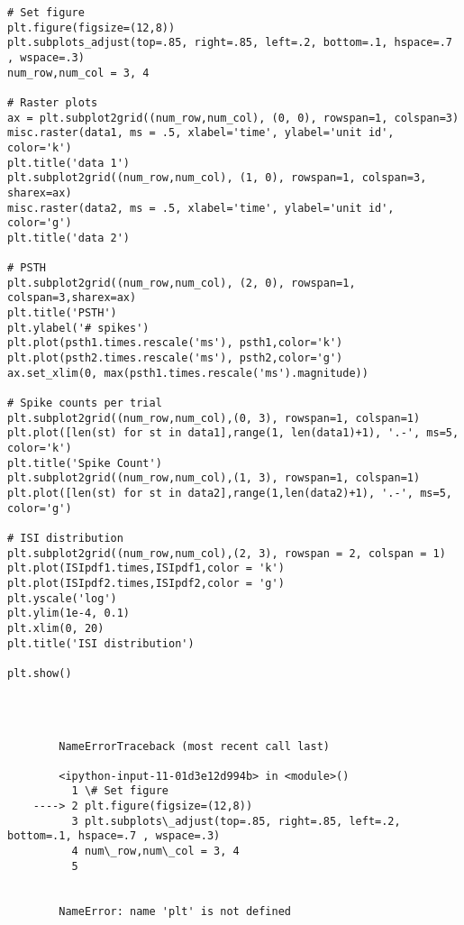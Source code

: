 \begin{lstlisting}
# Set figure
plt.figure(figsize=(12,8))
plt.subplots_adjust(top=.85, right=.85, left=.2, bottom=.1, hspace=.7 , wspace=.3)
num_row,num_col = 3, 4

# Raster plots
ax = plt.subplot2grid((num_row,num_col), (0, 0), rowspan=1, colspan=3)
misc.raster(data1, ms = .5, xlabel='time', ylabel='unit id', color='k')
plt.title('data 1')
plt.subplot2grid((num_row,num_col), (1, 0), rowspan=1, colspan=3, sharex=ax)
misc.raster(data2, ms = .5, xlabel='time', ylabel='unit id', color='g')
plt.title('data 2')

# PSTH
plt.subplot2grid((num_row,num_col), (2, 0), rowspan=1, colspan=3,sharex=ax)
plt.title('PSTH')
plt.ylabel('# spikes')
plt.plot(psth1.times.rescale('ms'), psth1,color='k')
plt.plot(psth2.times.rescale('ms'), psth2,color='g')
ax.set_xlim(0, max(psth1.times.rescale('ms').magnitude))

# Spike counts per trial
plt.subplot2grid((num_row,num_col),(0, 3), rowspan=1, colspan=1)
plt.plot([len(st) for st in data1],range(1, len(data1)+1), '.-', ms=5, color='k')
plt.title('Spike Count')
plt.subplot2grid((num_row,num_col),(1, 3), rowspan=1, colspan=1)
plt.plot([len(st) for st in data2],range(1,len(data2)+1), '.-', ms=5, color='g')

# ISI distribution
plt.subplot2grid((num_row,num_col),(2, 3), rowspan = 2, colspan = 1)
plt.plot(ISIpdf1.times,ISIpdf1,color = 'k')
plt.plot(ISIpdf2.times,ISIpdf2,color = 'g')
plt.yscale('log')
plt.ylim(1e-4, 0.1)
plt.xlim(0, 20)
plt.title('ISI distribution')

plt.show()
\end{lstlisting}%
    \begin{Verbatim}[commandchars=\\\{\}]

        

        NameErrorTraceback (most recent call last)

        <ipython-input-11-01d3e12d994b> in <module>()
          1 \# Set figure
    ----> 2 plt.figure(figsize=(12,8))
          3 plt.subplots\_adjust(top=.85, right=.85, left=.2, bottom=.1, hspace=.7 , wspace=.3)
          4 num\_row,num\_col = 3, 4
          5 


        NameError: name 'plt' is not defined

    \end{Verbatim}


    
    
%
%

    
    